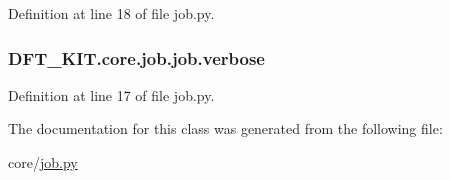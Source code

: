 Definition at line 18 of file job.\+py.

\hypertarget{class_d_f_t___k_i_t_1_1core_1_1job_1_1job_a9dd538e066c27fca43c2f32277ff1a14}{
\subsubsection[{verbose}]{\setlength{\rightskip}{0pt plus 5cm}D\+F\+T\+\_\+\+K\+I\+T.\+core.\+job.\+job.\+verbose}}\label{class_d_f_t___k_i_t_1_1core_1_1job_1_1job_a9dd538e066c27fca43c2f32277ff1a14}


Definition at line 17 of file job.\+py.



The documentation for this class was generated from the following file\+:\begin{DoxyCompactItemize}
\item 
core/\hyperlink{job_8py}{job.\+py}\end{DoxyCompactItemize}
